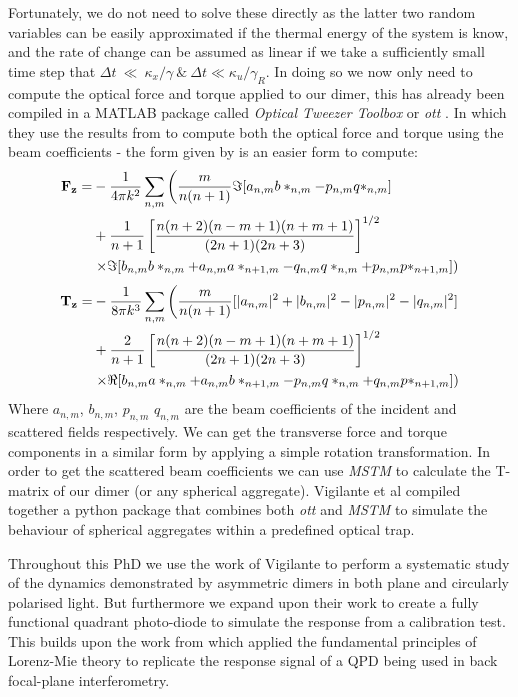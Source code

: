 \documentclass[a4paper,oneside,11pt]{book}
\begin{document}
Fortunately, we do not need to solve these directly as the latter two random variables can be easily approximated if the thermal energy of the system is know, and the rate of change can be assumed as linear if we take a sufficiently small time step that $\Delta t~\ll~\kappa_x/\gamma \ \& \ \Delta t \ll \kappa_u/\gamma_R$. In doing so we now only need to compute the optical force and torque applied to our dimer, this has already been compiled in a MATLAB package called \textit{Optical Tweezer Toolbox} or \textit{ott} \cite{Nieminen2007}. In which they use the results from \cite{Farsund1996} to compute both the optical force and torque using the beam coefficients - the form given by \cite{Crichton2000THEMD} is an easier form to compute: 
\begin{equation}
\begin{split}
	\bold{F_z}=&-\frac{1}{4\pi k^2}\sum_{n,m} \left(\frac{m}{n(n+1)}\Im[a_{n,m}b*_{n,m}-p_{n,m}q*_{n,m}] \right. \\ 
	&+\frac{1}{n+1}\left[\frac{n(n+2)(n-m+1)(n+m+1)}{(2n+1)(2n+3)} \right]^{1/2}  \\
	& \left. \times \Im[b_{n,m}b*_{n,m}+a_{n,m}a*_{n+1,m} - q_{n,m}q*_{n,m}+p_{n,m}p*_{n+1,m}] \right)
\end{split}
\end{equation}
\begin{equation}
\begin{split}
	\bold{T_z}=&-\frac{1}{8\pi k^3}\sum_{n,m} \left(\frac{m}{n(n+1)}[|a_{n,m}|^2+|b_{n,m}|^2-|p_{n,m}|^2-|q_{n,m}|^2] \right. \\ 
	&+\frac{2}{n+1}\left[\frac{n(n+2)(n-m+1)(n+m+1)}{(2n+1)(2n+3)} \right]^{1/2}  \\
	& \left. \times \Re[b_{n,m}a*_{n,m}+a_{n,m}b*_{n+1,m} - p_{n,m}q*_{n,m}+q_{n,m}p*_{n+1,m}] \right)
\end{split}
\end{equation}
Where $a_{n,m}$, $b_{n,m}$, $p_{n,m}$ $q_{n,m}$ are the beam coefficients of the incident and scattered fields respectively. We can get the transverse force and torque components in a similar form by applying a simple rotation transformation. In order to get the scattered beam coefficients we can use \textit{MSTM} \cite{Mackowski2011} to calculate the T-matrix of our dimer (or any spherical aggregate). Vigilante et al compiled together a python package that combines both \textit{ott} and \textit{MSTM} to simulate the behaviour of spherical aggregates within a predefined optical trap. 

Throughout this PhD we use the work of Vigilante to perform a systematic study of the dynamics demonstrated by asymmetric dimers in both plane and circularly polarised light. But furthermore we expand upon their work to create a fully functional quadrant photo-diode to simulate the response from a calibration test. This builds upon the work from \cite{Rohrbach2002} which applied the fundamental principles of Lorenz-Mie theory to replicate the response signal of a QPD being used in back focal-plane interferometry.
\end{document}
